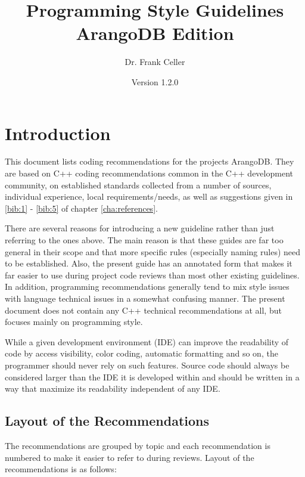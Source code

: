 \documentclass[a4paper,11pt,oneside]{scrbook}
\title{Programming Style Guidelines\\ ArangoDB Edition}
\author{Dr. Frank Celler}
\date{Version 1.2.0}
\begin{document}
\maketitle
\tableofcontents
%
\chapter{Introduction}

This document lists coding recommendations for the projects ArangoDB.  They are
based on C++ coding recommendations common in the C++ development community, on
established standards collected from a number of sources, individual experience,
local requirements/needs, as well as suggestions given in \ref{bib:1} -
\ref{bib:5} of chapter \ref{cha:references}.

There are several reasons for introducing a new guideline rather than just
referring to the ones above. The main reason is that these guides are far too
general in their scope and that more specific rules (especially naming rules)
need to be established. Also, the present guide has an annotated form that makes
it far easier to use during project code reviews than most other existing
guidelines. In addition, programming recommendations generally tend to mix style
issues with language technical issues in a somewhat confusing manner. The
present document does not contain any C++ technical recommendations at all, but
focuses mainly on programming style.

While a given development environment (IDE) can improve the readability of code
by access visibility, color coding, automatic formatting and so on, the
programmer should never rely on such features. Source code should always be
considered larger than the IDE it is developed within and should be written in a
way that maximize its readability independent of any IDE.

\section{Layout of the Recommendations}

The recommendations are grouped by topic and each recommendation is numbered to
make it easier to refer to during reviews. Layout of the recommendations is as
follows:
\end{document}

